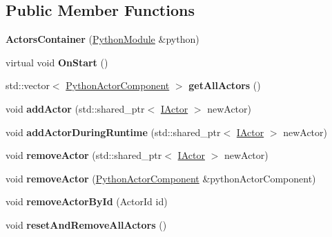 \subsection*{Public Member Functions}
\begin{DoxyCompactItemize}
\item 
{\bfseries Actors\+Container} (\hyperlink{classPythonModule}{Python\+Module} \&python)\hypertarget{classActorsContainer_a1ab15fe14a06a9692ab56284b1626411}{}\label{classActorsContainer_a1ab15fe14a06a9692ab56284b1626411}

\item 
virtual void {\bfseries On\+Start} ()\hypertarget{classActorsContainer_a34beffae5a573714b04971ebc465607d}{}\label{classActorsContainer_a34beffae5a573714b04971ebc465607d}

\item 
std\+::vector$<$ \hyperlink{classPythonActorComponent}{Python\+Actor\+Component} $>$ {\bfseries get\+All\+Actors} ()\hypertarget{classActorsContainer_a31bc1fb0617d8aaa76fc737e4b4a6ae5}{}\label{classActorsContainer_a31bc1fb0617d8aaa76fc737e4b4a6ae5}

\item 
void {\bfseries add\+Actor} (std\+::shared\+\_\+ptr$<$ \hyperlink{classIActor}{I\+Actor} $>$ new\+Actor)\hypertarget{classActorsContainer_a1e95e6ee2558da4e7bb14c889a0d416b}{}\label{classActorsContainer_a1e95e6ee2558da4e7bb14c889a0d416b}

\item 
void {\bfseries add\+Actor\+During\+Runtime} (std\+::shared\+\_\+ptr$<$ \hyperlink{classIActor}{I\+Actor} $>$ new\+Actor)\hypertarget{classActorsContainer_aeb74636b92532dbfcf674e6d98ff76b8}{}\label{classActorsContainer_aeb74636b92532dbfcf674e6d98ff76b8}

\item 
void {\bfseries remove\+Actor} (std\+::shared\+\_\+ptr$<$ \hyperlink{classIActor}{I\+Actor} $>$ new\+Actor)\hypertarget{classActorsContainer_a0f4efa35b84767e3156c8e6affc139e3}{}\label{classActorsContainer_a0f4efa35b84767e3156c8e6affc139e3}

\item 
void {\bfseries remove\+Actor} (\hyperlink{classPythonActorComponent}{Python\+Actor\+Component} \&python\+Actor\+Component)\hypertarget{classActorsContainer_a572b8b7a645027fc6c2a3c8a2d92bd03}{}\label{classActorsContainer_a572b8b7a645027fc6c2a3c8a2d92bd03}

\item 
void {\bfseries remove\+Actor\+By\+Id} (Actor\+Id id)\hypertarget{classActorsContainer_a261fed6fb7490153d42dc9a1675d6f85}{}\label{classActorsContainer_a261fed6fb7490153d42dc9a1675d6f85}

\item 
void {\bfseries reset\+And\+Remove\+All\+Actors} ()\hypertarget{classActorsContainer_ab61682f3c61e766c93f3bbe77436008b}{}\label{classActorsContainer_ab61682f3c61e766c93f3bbe77436008b}

\end{DoxyCompactItemize}

